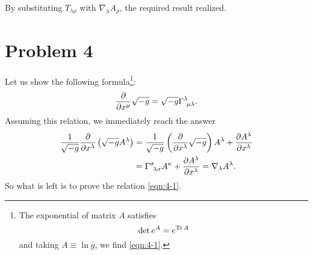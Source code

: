 \documentclass[a4paper,pdftex,10pt]{article}
\begin{document}
By substituting $T_{\lambda\rho}$ with $\nabla_{\lambda}A_{\rho}$, the required result realized.


\clearpage
\section{Problem 4}

Let us show the following formula\footnote{
  The exponential of matrix $A$ satisfies
  \begin{equation}
    \det e^{A}=e^{\Tr A}
    \nonumber
  \end{equation}
  and taking $A\equiv\ln g$, we find \eqref{eqn:4-1}.
}:
\begin{equation}
  \pdv{}{x^{\mu}}\sqrt{-g}
  =
  \sqrt{-g}\Gamma^{\lambda}_{\ \mu\lambda}
  .
  \label{eqn:4-1}
\end{equation}
Assuming this relation, we immediately reach the answer
\begin{align}
  \frac{1}{\sqrt{-g}}\pdv{}{x^{\lambda}}\left(\sqrt{-g}A^{\lambda}\right)
   & =
  \frac{1}{\sqrt{-g}}\left( \pdv{}{x^{\lambda}}\sqrt{-g} \right)A^{\lambda}
  +
  \pdv{A^{\lambda}}{x^{\lambda}}
  \nonumber
  \\
   & =
  \Gamma^{\sigma}_{\ \lambda\sigma}A^{\kappa}
  +
  \pdv{A^{\lambda}}{x^{\lambda}}
  =
  \nabla_{\lambda}A^{\lambda}
  .
\end{align}
So what is left is to prove the relation \eqref{eqn:4-1}.
\end{document}
